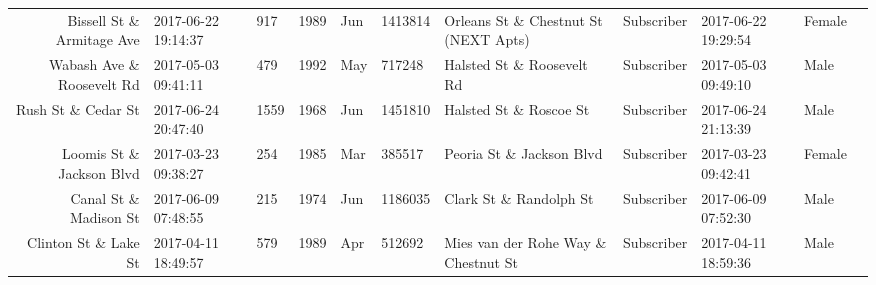 \documentclass[11pt]{article}
\begin{document}
\begin{tabular}{r|llllllllll}
	 Bissell St \& Armitage Ave            & 2017-06-22 19:14:37                    &  917                                   & 1989                                   & Jun                                    & 1413814                                & Orleans St \& Chestnut St (NEXT Apts) & Subscriber                             & 2017-06-22 19:29:54                    & Female                                \\
	 Wabash Ave \& Roosevelt Rd            & 2017-05-03 09:41:11                    &  479                                   & 1992                                   & May                                    &  717248                                & Halsted St \& Roosevelt Rd            & Subscriber                             & 2017-05-03 09:49:10                    & Male                                  \\
	 Rush St \& Cedar St                   & 2017-06-24 20:47:40                    & 1559                                   & 1968                                   & Jun                                    & 1451810                                & Halsted St \& Roscoe St               & Subscriber                             & 2017-06-24 21:13:39                    & Male                                  \\
	 Loomis St \& Jackson Blvd             & 2017-03-23 09:38:27                    &  254                                   & 1985                                   & Mar                                    &  385517                                & Peoria St \& Jackson Blvd             & Subscriber                             & 2017-03-23 09:42:41                    & Female                                \\
	 Canal St \& Madison St                & 2017-06-09 07:48:55                    &  215                                   & 1974                                   & Jun                                    & 1186035                                & Clark St \& Randolph St               & Subscriber                             & 2017-06-09 07:52:30                    & Male                                  \\
	 Clinton St \& Lake St                 & 2017-04-11 18:49:57                    &  579                                   & 1989                                   & Apr                                    &  512692                                & Mies van der Rohe Way \& Chestnut St  & Subscriber                             & 2017-04-11 18:59:36                    & Male                                  \\

\end{tabular}
\end{document}
